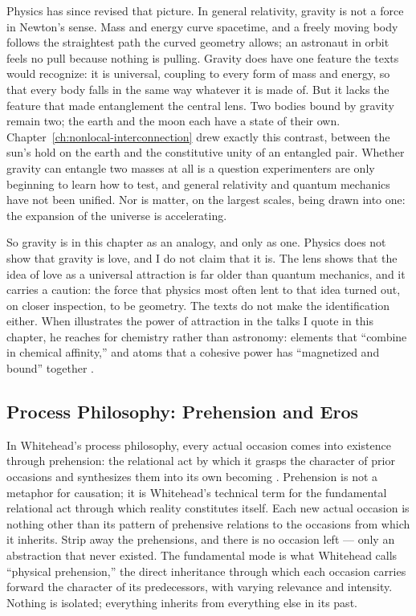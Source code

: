 Physics has since revised that picture. In general relativity, gravity is not a force in Newton's sense. Mass and energy curve spacetime, and a freely moving body follows the straightest path the curved geometry allows; an astronaut in orbit feels no pull because nothing is pulling. Gravity does have one feature the \bahai texts would recognize: it is universal, coupling to every form of mass and energy, so that every body falls in the same way whatever it is made of. But it lacks the feature that made entanglement the central lens. Two bodies bound by gravity remain two; the earth and the moon each have a state of their own. Chapter~\ref{ch:nonlocal-interconnection} drew exactly this contrast, between the sun's hold on the earth and the constitutive unity of an entangled pair. Whether gravity can entangle two masses at all is a question experimenters are only beginning to learn how to test, and general relativity and quantum mechanics have not been unified. Nor is matter, on the largest scales, being drawn into one: the expansion of the universe is accelerating.

So gravity is in this chapter as an analogy, and only as one. Physics does not show that gravity is love, and I do not claim that it is. The lens shows that the idea of love as a universal attraction is far older than quantum mechanics, and it carries a caution: the force that physics most often lent to that idea turned out, on closer inspection, to be geometry. The \bahai texts do not make the identification either. When \AbdulBaha illustrates the power of attraction in the talks I quote in this chapter, he reaches for chemistry rather than astronomy: elements that ``combine in chemical affinity,'' and atoms that a cohesive power has ``magnetized and bound'' together \citep[Talk 74]{PUP}.

\subsection*{Process Philosophy: Prehension and Eros}

In Whitehead's process philosophy, every actual occasion comes into existence through prehension: the relational act by which it grasps the character of prior occasions and synthesizes them into its own becoming \citep{Whitehead1929}. Prehension is not a metaphor for causation; it is Whitehead's technical term for the fundamental relational act through which reality constitutes itself. Each new actual occasion is nothing other than its pattern of prehensive relations to the occasions from which it inherits. Strip away the prehensions, and there is no occasion left — only an abstraction that never existed. The fundamental mode is what Whitehead calls ``physical prehension,'' the direct inheritance through which each occasion carries forward the character of its predecessors, with varying relevance and intensity. Nothing is isolated; everything inherits from everything else in its past.

